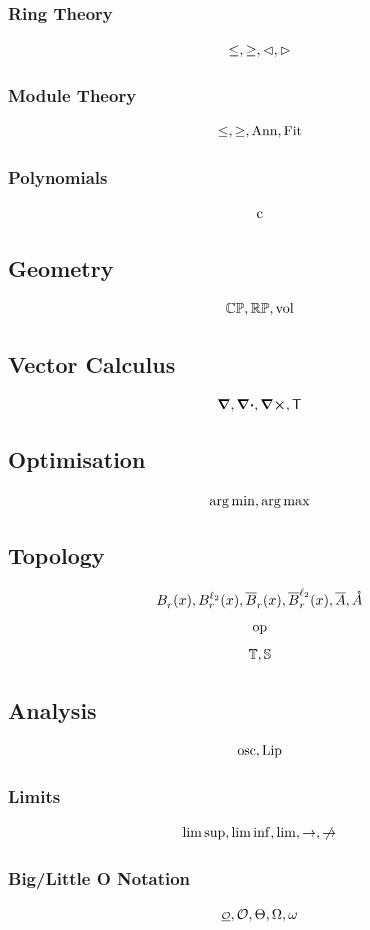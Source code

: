 \documentclass{article}
\begin{document}
\subsubsection{Ring Theory}
\[
    \leq, \geq, \lhd, \rhd
\]  

\subsubsection{Module Theory}
\[
    \leq, \geq, \operatorname{Ann}, \operatorname{Fit}
\]

\subsubsection{Polynomials}
\[
    \operatorname{c}
\]

\subsection{Geometry}
\[
    \mathbb{C}\mathbb{P}, \mathbb{R}\mathbb{P}, \operatorname{vol}
\]

\subsection{Vector Calculus}
\[
    \grad, \div, \curl, \mathsf{T}
\]

\subsection{Optimisation}
\[
    \operatorname*{arg\,min}, \operatorname*{arg\,max}
\]

\subsection{Topology}
\[
    \oball{x}{r}, \oball[\ell_2]{x}{r}, \cball{x}{r}, \cball[\ell_2]{x}{r}, \closure{A}, \interior{A}
\]
\[
    \text{op}
\]
\[
    \mathbb{T}, \mathbb{S}
\]

\subsection{Analysis}
\[
    \operatorname*{osc}, \operatorname*{Lip}
\]

\subsubsection{Limits}
\[
    \limsup, \liminf, \lim, \to, \notto
\]

\subsubsection{Big/Little O Notation}
\[
    \littleO, \bigO, \bigTheta, \bigOmega, \littleOmega
\]
\end{document}
